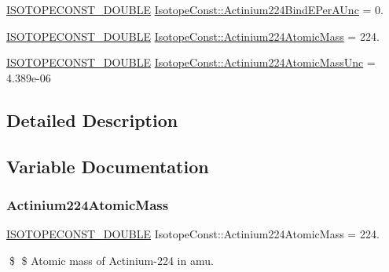 \begin{DoxyCompactItemize}
\mbox{\hyperlink{group___isotope_const-_macros_ga8f45a7272ce02c0b4c65c44636ed719a}{I\+S\+O\+T\+O\+P\+E\+C\+O\+N\+S\+T\+\_\+\+D\+O\+U\+B\+LE}} \mbox{\hyperlink{group___isotope_const-_actinium-_ac224_ga656d9c6fccbd8b0a7abe60db5280ea0e}{Isotope\+Const\+::\+Actinium224\+Bind\+E\+Per\+A\+Unc}} = 0.
\item 
\mbox{\hyperlink{group___isotope_const-_macros_ga8f45a7272ce02c0b4c65c44636ed719a}{I\+S\+O\+T\+O\+P\+E\+C\+O\+N\+S\+T\+\_\+\+D\+O\+U\+B\+LE}} \mbox{\hyperlink{group___isotope_const-_actinium-_ac224_gab0eedce53e6ee687e780048eb8ddb94b}{Isotope\+Const\+::\+Actinium224\+Atomic\+Mass}} = 224.
\item 
\mbox{\hyperlink{group___isotope_const-_macros_ga8f45a7272ce02c0b4c65c44636ed719a}{I\+S\+O\+T\+O\+P\+E\+C\+O\+N\+S\+T\+\_\+\+D\+O\+U\+B\+LE}} \mbox{\hyperlink{group___isotope_const-_actinium-_ac224_ga8061e8ae36d484c4085aa1680a029ac8}{Isotope\+Const\+::\+Actinium224\+Atomic\+Mass\+Unc}} = 4.\+389e-\/06
\end{DoxyCompactItemize}


\subsection{Detailed Description}


\subsection{Variable Documentation}
\mbox{\label{group___isotope_const-_actinium-_ac224_gab0eedce53e6ee687e780048eb8ddb94b}} 
\subsubsection{\texorpdfstring{Actinium224\+Atomic\+Mass}{Actinium224AtomicMass}}
{\footnotesize\ttfamily \mbox{\hyperlink{group___isotope_const-_macros_ga8f45a7272ce02c0b4c65c44636ed719a}{I\+S\+O\+T\+O\+P\+E\+C\+O\+N\+S\+T\+\_\+\+D\+O\+U\+B\+LE}} Isotope\+Const\+::\+Actinium224\+Atomic\+Mass = 224.}

\$ \$ Atomic mass of Actinium-\/224 in amu. \mbox{\label{group___isotope_const-_actinium-_ac224_ga8061e8ae36d484c4085aa1680a029ac8}} 
